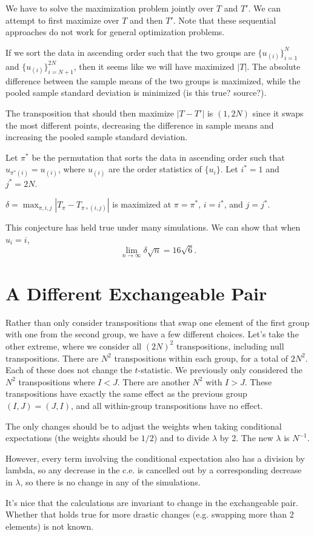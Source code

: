 We have to solve the maximization problem jointly over $T$ and $T'$.  We can
attempt to first maximize over $T$ and then $T'$.  Note that these sequential
approaches do not work for general optimization problems.

If we sort the data in ascending order such that the two groups are
$\{u_{(i)}\}_{i=1}^{N}$ and $\{u_{(i)}\}_{i=N+1}^{2N}$, then it seems like
we will have maximized $|T|$.  The absolute difference between the sample
means of the two groups is maximized, while the pooled sample standard
deviation is minimized (is this true? source?).

The transposition that should then maximize $|T - T'|$ is $(1, 2N)$ since it
swaps the most different points, decreasing the difference in sample means and
increasing the pooled sample standard deviation.

Let $\pi^*$ be the permutation that sorts the data in ascending order
such that $u_{\pi^*(i)} = u_{(i)}$, where $u_{(i)}$ are the order statistics
of $\{u_i\}$.  Let $i^* = 1$ and $j^* = 2N$.

\begin{conjecture}
  $\delta = \max_{\pi, i, j} |T_{\pi} - T_{\pi \circ (i, j)}|$ is maximized at
  $\pi = \pi^*$, $i = i^*$, and $j = j^*$.
\end{conjecture}

This conjecture has held true under many simulations.  We can show that when $u_i = i$,
\begin{equation*}
  \lim_{n \to \infty} \delta \sqrt{n} = 16 \sqrt{6}.
\end{equation*}

\section{A Different Exchangeable Pair}
Rather than only consider transpositions that swap one element of the
first group with one from the second group, we have a few different
choices.  Let's take the other extreme, where we consider all $(2N)^2$
transpositions, including null transpositions.  There are $N^2$
transpositions within each group, for a total of $2N^2$.  Each of
these does not change the $t$-statistic.  We previously only
considered the $N^2$ transpositions where $I < J$.  There are another
$N^2$ with $I > J$.  These transpositions have exactly the same effect
as the previous group $(I, J) = (J, I)$, and all within-group
transpositions have no effect.

The only changes should be to adjust the weights when taking
conditional expectations (the weights should be $1/2$) and to divide
$\lambda$ by 2.  The new $\lambda$ is $N^{-1}$.

However, every term involving the conditional expectation also has a
division by lambda, so any decrease in the c.e. is cancelled out by a
corresponding decrease in $\lambda$, so there is no change in any of
the simulations.

It's nice that the calculations are invariant to change in the
exchangeable pair.  Whether that holds true for more drastic changes
(e.g. swapping more than 2 elements) is not known.
